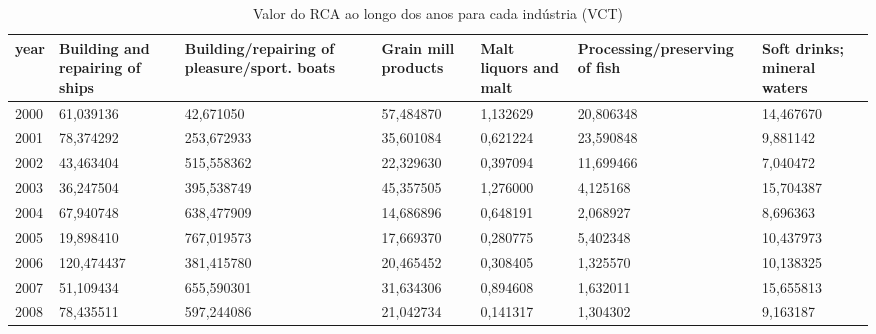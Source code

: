 \begin{table}
\centering
\caption{Valor do RCA ao longo dos anos para cada indústria (VCT)}
\begin{tabular}{p{1cm}p{2cm}p{2cm}p{2cm}p{2cm}p{2cm}p{2cm}}
\toprule
 year &  Building and repairing of ships &  Building/repairing of pleasure/sport. boats &  Grain mill products &  Malt liquors and malt &  Processing/preserving of fish &  Soft drinks; mineral waters \\
\midrule
 2000 &                        61,039136 &                                    42,671050 &            57,484870 &               1,132629 &                      20,806348 &                    14,467670 \\
 2001 &                        78,374292 &                                   253,672933 &            35,601084 &               0,621224 &                      23,590848 &                     9,881142 \\
 2002 &                        43,463404 &                                   515,558362 &            22,329630 &               0,397094 &                      11,699466 &                     7,040472 \\
 2003 &                        36,247504 &                                   395,538749 &            45,357505 &               1,276000 &                       4,125168 &                    15,704387 \\
 2004 &                        67,940748 &                                   638,477909 &            14,686896 &               0,648191 &                       2,068927 &                     8,696363 \\
 2005 &                        19,898410 &                                   767,019573 &            17,669370 &               0,280775 &                       5,402348 &                    10,437973 \\
 2006 &                       120,474437 &                                   381,415780 &            20,465452 &               0,308405 &                       1,325570 &                    10,138325 \\
 2007 &                        51,109434 &                                   655,590301 &            31,634306 &               0,894608 &                       1,632011 &                    15,655813 \\
 2008 &                        78,435511 &                                   597,244086 &            21,042734 &               0,141317 &                       1,304302 &                     9,163187 \\

\end{tabular}
\end{table}

